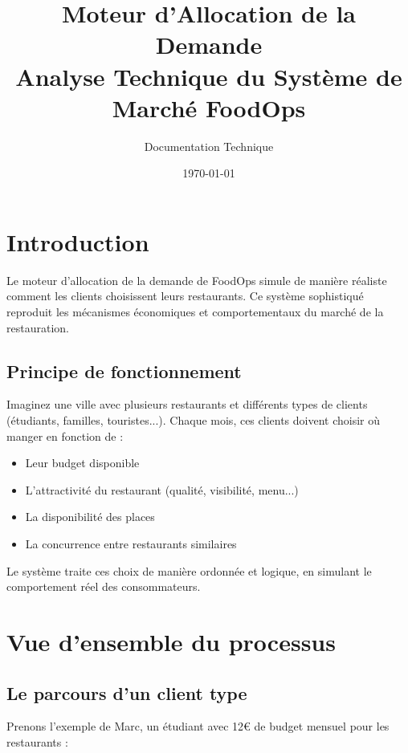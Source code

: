 \documentclass[12pt,a4paper]{article}
\title{\textbf{Moteur d'Allocation de la Demande}\\
\large{Analyse Technique du Système de Marché FoodOps}}
\author{Documentation Technique}
\date{\today}
\begin{document}
\maketitle

\tableofcontents
\newpage

\section{Introduction}

Le moteur d'allocation de la demande de FoodOps simule de manière réaliste comment les clients choisissent leurs restaurants. Ce système sophistiqué reproduit les mécanismes économiques et comportementaux du marché de la restauration.

\subsection{Principe de fonctionnement}

Imaginez une ville avec plusieurs restaurants et différents types de clients (étudiants, familles, touristes...). Chaque mois, ces clients doivent choisir où manger en fonction de :
\begin{itemize}
    \item Leur budget disponible
    \item L'attractivité du restaurant (qualité, visibilité, menu...)
    \item La disponibilité des places
    \item La concurrence entre restaurants similaires
\end{itemize}

Le système traite ces choix de manière ordonnée et logique, en simulant le comportement réel des consommateurs.

\section{Vue d'ensemble du processus}

\subsection{Le parcours d'un client type}

Prenons l'exemple de Marc, un étudiant avec 12€ de budget mensuel pour les restaurants :
\end{document}
